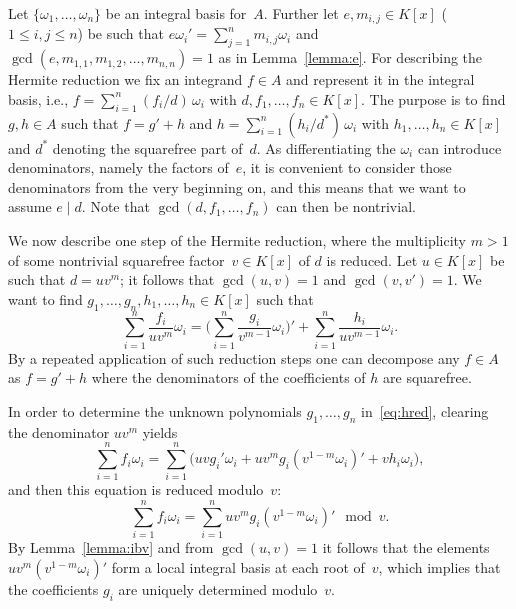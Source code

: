 \documentclass{sig-alternate}
\begin{document}
Let $\{\omega_1,\ldots,\omega_n\}$ be an integral basis for~$A$.
Further let $e,m_{i,j}\in K[x]$ ($1\leq i,j\leq n$) be such that
$e\omega_i'=\sum_{j=1}^n m_{i,j}\omega_i$ and
$\gcd(e,m_{1,1},m_{1,2},\ldots,m_{n,n})=1$ as in Lemma~\ref{lemma:e}. For describing
the Hermite reduction we fix an integrand $f\in A$ and represent it in the
integral basis, i.e., $f=\sum_{i=1}^n (f_i/d)\,\omega_i$ with
$d,f_1,\ldots,f_n\in K[x]$. The purpose is to find $g,h\in A$ such that
$f=g'+h$ and $h=\sum_{i=1}^n(h_i/d^\ast)\,\omega_i$ with $h_1,\ldots,h_n\in K[x]$
and $d^\ast$ denoting the squarefree part of~$d$.
As differentiating the $\omega_i$ can introduce
denominators, name\-ly the factors of~$e$, it is convenient to consider those
denominators from the very beginning on, and this means that we want to assume
$e\mid d$. Note that $\gcd(d,f_1,\ldots,f_n)$ can then be nontrivial.

We now describe one step of the Hermite reduction, where the multiplicity
$m>1$ of some nontrivial squarefree factor~$v\in K[x]$ of $d$ is reduced.
Let $u\in K[x]$ be such that $d=uv^m$; it follows that $\gcd(u,v)=1$ and
$\gcd(v,v')=1$. We want to find $g_1,\ldots,g_n,h_1,\ldots,h_n\in K[x]$
such that
\begin{equation}\label{eq:hred}
  \sum_{i=1}^n \frac{f_i}{uv^m}\omega_i =
  \biggl(\sum_{i=1}^n\frac{g_i}{v^{m-1}}\omega_i\biggr)' +
  \sum_{i=1}^n \frac{h_i}{uv^{m-1}}\omega_i.
\end{equation}
By a repeated application of such reduction steps one can decompose any $f\in A$
as $f=g'+h$ where the denominators of the coefficients of $h$ are squarefree.

In order to determine the unknown polynomials $g_1,\ldots,g_n$ in~\eqref{eq:hred},
clearing the denominator $uv^m$ yields
\begin{equation}\label{eq:clear}
  \sum_{i=1}^n f_i\omega_i = \sum_{i=1}^n \biggl( uvg_i'\omega_i +
  uv^mg_i\left(v^{1-m}\omega_i\right)' + vh_i\omega_i \biggr),
\end{equation}
and then this equation is reduced modulo~$v$:
\begin{equation}\label{eq:modv}
  \sum_{i=1}^n f_i\omega_i =
  \sum_{i=1}^n uv^mg_i\left(v^{1-m}\omega_i\right)' \mod v.
\end{equation}
By Lemma~\ref{lemma:ibv} and from $\gcd(u,v)=1$ it follows that
the elements $uv^m(v^{1-m}\omega_i)'$ form a local integral basis
at each root of~$v$, which implies that the coefficients $g_i$ are
uniquely determined modulo~$v$.
\end{document}
